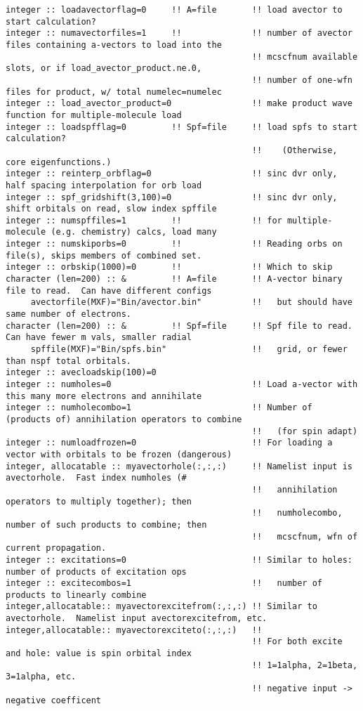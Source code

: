 \begin{verbatim}
integer :: loadavectorflag=0     !! A=file       !! load avector to start calculation?
integer :: numavectorfiles=1     !!              !! number of avector files containing a-vectors to load into the
                                                 !! mcscfnum available slots, or if load_avector_product.ne.0,
                                                 !! number of one-wfn files for product, w/ total numelec=numelec
integer :: load_avector_product=0                !! make product wave function for multiple-molecule load
integer :: loadspfflag=0         !! Spf=file     !! load spfs to start calculation?  
                                                 !!    (Otherwise, core eigenfunctions.)
integer :: reinterp_orbflag=0                    !! sinc dvr only, half spacing interpolation for orb load
integer :: spf_gridshift(3,100)=0                !! sinc dvr only, shift orbitals on read, slow index spffile
integer :: numspffiles=1         !!              !! for multiple-molecule (e.g. chemistry) calcs, load many
integer :: numskiporbs=0         !!              !! Reading orbs on file(s), skips members of combined set.
integer :: orbskip(1000)=0       !!              !! Which to skip
character (len=200) :: &         !! A=file       !! A-vector binary file to read.  Can have different configs
     avectorfile(MXF)="Bin/avector.bin"          !!   but should have same number of electrons.   
character (len=200) :: &         !! Spf=file     !! Spf file to read.  Can have fewer m vals, smaller radial 
     spffile(MXF)="Bin/spfs.bin"                 !!   grid, or fewer than nspf total orbitals. 
integer :: avecloadskip(100)=0
integer :: numholes=0                            !! Load a-vector with this many more electrons and annihilate
integer :: numholecombo=1                        !! Number of (products of) annihilation operators to combine 
                                                 !!   (for spin adapt)
integer :: numloadfrozen=0                       !! For loading a vector with orbitals to be frozen (dangerous)
integer, allocatable :: myavectorhole(:,:,:)     !! Namelist input is avectorhole.  Fast index numholes (#
                                                 !!   annihilation operators to multiply together); then    
                                                 !!   numholecombo, number of such products to combine; then
                                                 !!   mcscfnum, wfn of current propagation.
integer :: excitations=0                         !! Similar to holes: number of products of excitation ops
integer :: excitecombos=1                        !!   number of products to linearly combine
integer,allocatable:: myavectorexcitefrom(:,:,:) !! Similar to avectorhole.  Namelist input avectorexcitefrom, etc.
integer,allocatable:: myavectorexciteto(:,:,:)   !!
                                                 !! For both excite and hole: value is spin orbital index
                                                 !! 1=1alpha, 2=1beta, 3=1alpha, etc.
                                                 !! negative input -> negative coefficent
\end{verbatim}
